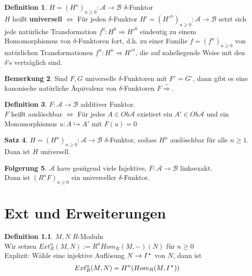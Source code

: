 \documentclass[10pt,a4paper,numbers=endperiod]{scrreprt}
\theoremstyle{definition}
\newtheorem{satz}{Satz}[section]
\newtheorem{defi}[satz]{Definition}
\newtheorem{bem}[satz]{Bemerkung}
\newtheorem{folg}[satz]{Folgerung}
\newcommand{\point}{\text{\textbullet}}
\begin{document}
\begin{defi}
	$H = (H^n)_{n \geq 0}: \mathcal{A} \to \mathcal{B}$ $\delta$-Funktor\\
	$H$ heißt \textbf{universell} $\Leftrightarrow$ Für jeden $\delta$-Funktor $H' = (H'^n)_{n \geq 0}: \mathcal{A} \to \mathcal{B}$ setzt sich jede natürliche Transformation $f^0: H^0 \Rightarrow H'^0$ eindeutig zu einem Homomorphismus von $\delta$-Funktoren fort, d.h. zu einer Familie $f = (f^n)_{n \geq 0}$ von natürlichen Transformationen $f^n: H^n \Rightarrow H'^n$, die auf naheliegende Weise mit den $\delta$'s verträglich sind.
\end{defi}

\begin{bem}
	Sind $F, G$ universelle $\delta$-Funktoren mit $F^\circ = G^\circ$, dann gibt es eine kanonische natürliche Äquivalenz von $\delta$-Funktoren $F \overset{\sim}{\Rightarrow}$. 
\end{bem}

\begin{defi}
	$F: \mathcal{A} \to \mathcal{B}$ additiver Funktor.\\
	$F$ heißt auslöschbar $\Leftrightarrow$ Für jedes $A \in Ob \mathcal{A}$ existiert ein $A' \in Ob \mathcal{A}$ und ein Monomorphismus $u: A \hookrightarrow A'$ mit $F(u) = 0$
\end{defi}

\begin{satz}
	$H = (H^n)_{n \geq 0}: \mathcal{A} \to \mathcal{B}$ $\delta$-Funktor, sodass $H^n$ auslöschbar für alle $n \geq 1$.\\
	Dann ist $H$ universell.
\end{satz}

\begin{folg}
	$\mathcal{A}$ have genügend viele Injektive, $F: \mathcal{A} \to \mathcal{B}$ linksexakt.\\
	Dann ist $(R^nF)_{n \geq 0}$ ein universeller $\delta$-Funktor. 
\end{folg}

\chapter{Ext und Erweiterungen} 

\begin{defi}
	$M, N$ $R$-Moduln\\
	Wir setzen $Ext_R^n(M,N) := R^n Hom_R(M,-)(N)$ für $n \geq 0$\\
	Explizit: Wähle eine injektive Auflösung $N \to I^\point$ von $N$, dann ist \begin{align*}
		Ext_R^n(M, N) = H^n(Hom_R(M, I^\point))
	\end{align*}
\end{defi}
\end{document}

